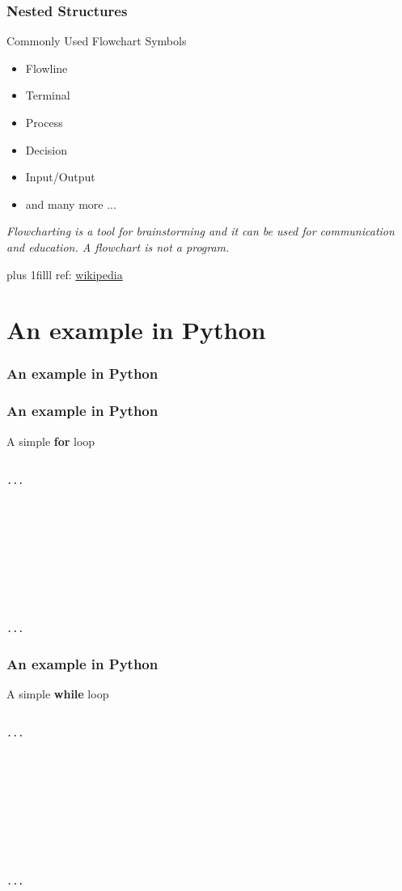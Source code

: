 \documentclass[fleqn]{beamer} %
\newcommand{\sectiontitleIV}{Nested Structures}
\newcommand{\sectiontitleV}{An example in Python}
\newcommand{\btVFill}{\vskip0pt plus 1filll}
\begin{document}
	\begin{frame}[label=sectionIV,containsverbatim] \small
	\frametitle{\sectiontitleIV}    
	
	Commonly Used Flowchart Symbols
	
	\begin{itemize}
		\item Flowline
		\item Terminal
		\item Process
		\item Decision
		\item Input/Output
		\item and many more ... 
		
	\end{itemize}

	{\it Flowcharting is a tool for brainstorming and it can be used for communication and education. A flowchart is not a program. }
	
	
	\btVFill
	\tiny{ref: \href{https://en.wikipedia.org/wiki/Flowchart}{wikipedia}} 
\end{frame}

\section{\sectiontitleV}	
	\begin{frame}[label=sectionV,containsverbatim] \small
	\frametitle{\sectiontitleV}    
	

\end{frame}

	\begin{frame}[label=sectionV,containsverbatim] \small
	\frametitle{\sectiontitleV}    
A simple {\bf for} loop	
	
\begin{lstlisting}

...










...			

\end{lstlisting}

	\end{frame}

\begin{frame}[label=sectionV,containsverbatim] \small
\frametitle{\sectiontitleV}    

A simple {\bf while} loop	

\begin{lstlisting}

...










...			

\end{lstlisting}

\end{frame}
\end{document}

